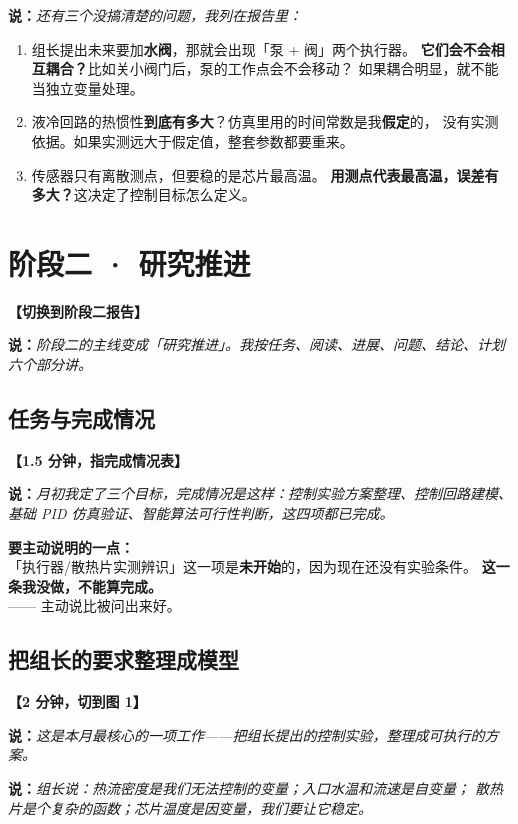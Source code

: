 \documentclass[11pt,a4paper]{ctexart}
\newcommand{\shuo}[1]{\par{\color{cBlue}\bfseries 说：}{\itshape #1}\par}
\newcommand{\dongzuo}[1]{\par{\color{cWarnLine}\bfseries 【#1】}\par}
\begin{document}
\shuo{还有三个没搞清楚的问题，我列在报告里：}

\begin{enumerate}
  \item 组长提出未来要加\textbf{水阀}，那就会出现「泵 + 阀」两个执行器。
        \textbf{它们会不会相互耦合？}比如关小阀门后，泵的工作点会不会移动？
        如果耦合明显，就不能当独立变量处理。
  \item 液冷回路的热惯性\textbf{到底有多大}？仿真里用的时间常数是我\textbf{假定}的，
        没有实测依据。如果实测远大于假定值，整套参数都要重来。
  \item 传感器只有离散测点，但要稳的是芯片最高温。
        \textbf{用测点代表最高温，误差有多大？}这决定了控制目标怎么定义。
\end{enumerate}

\section{阶段二 · 研究推进}

\dongzuo{切换到阶段二报告}

\shuo{阶段二的主线变成「研究推进」。我按任务、阅读、进展、问题、结论、计划六个部分讲。}

\subsection{任务与完成情况}

\dongzuo{1.5 分钟，指完成情况表}

\shuo{月初我定了三个目标，完成情况是这样：控制实验方案整理、控制回路建模、
基础 PID 仿真验证、智能算法可行性判断，这四项都已完成。}

\begin{tishi}
\textbf{要主动说明的一点：}\\
「执行器/散热片实测辨识」这一项是\textbf{未开始}的，因为现在还没有实验条件。
\textbf{这一条我没做，不能算完成。}\\[3pt]
—— 主动说比被问出来好。
\end{tishi}

\subsection{把组长的要求整理成模型}

\dongzuo{2 分钟，切到图 1}

\shuo{这是本月最核心的一项工作——把组长提出的控制实验，整理成可执行的方案。}

\shuo{组长说：热流密度是我们无法控制的变量；入口水温和流速是自变量；
散热片是个复杂的函数；芯片温度是因变量，我们要让它稳定。}
\end{document}
